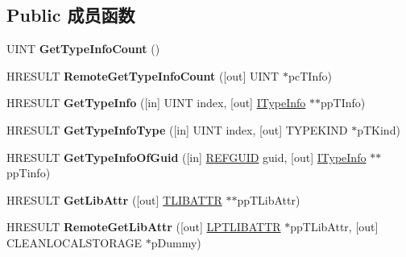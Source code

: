 \subsection*{Public 成员函数}
\begin{DoxyCompactItemize}
\item 
\mbox{\label{interface_i_type_lib_ac8e0fb0d09deff42b2c269285f9f87cd}} 
U\+I\+NT {\bfseries Get\+Type\+Info\+Count} ()
\item 
\mbox{\label{interface_i_type_lib_ab3b4927aa892c284fb67e568169d2770}} 
H\+R\+E\+S\+U\+LT {\bfseries Remote\+Get\+Type\+Info\+Count} (\mbox{[}out\mbox{]} U\+I\+NT $\ast$pc\+T\+Info)
\item 
\mbox{\label{interface_i_type_lib_a8a3fd1df05197ca1e21c4f6573a9a1ee}} 
H\+R\+E\+S\+U\+LT {\bfseries Get\+Type\+Info} (\mbox{[}in\mbox{]} U\+I\+NT index, \mbox{[}out\mbox{]} \hyperlink{interface_i_type_info}{I\+Type\+Info} $\ast$$\ast$pp\+T\+Info)
\item 
\mbox{\label{interface_i_type_lib_a8c76b724151cd1bd33f7f4d75453e283}} 
H\+R\+E\+S\+U\+LT {\bfseries Get\+Type\+Info\+Type} (\mbox{[}in\mbox{]} U\+I\+NT index, \mbox{[}out\mbox{]} T\+Y\+P\+E\+K\+I\+ND $\ast$p\+T\+Kind)
\item 
\mbox{\label{interface_i_type_lib_abb261b4a914df14578e02eae2a60dd32}} 
H\+R\+E\+S\+U\+LT {\bfseries Get\+Type\+Info\+Of\+Guid} (\mbox{[}in\mbox{]} \hyperlink{struct___g_u_i_d}{R\+E\+F\+G\+U\+ID} guid, \mbox{[}out\mbox{]} \hyperlink{interface_i_type_info}{I\+Type\+Info} $\ast$$\ast$pp\+Tinfo)
\item 
\mbox{\label{interface_i_type_lib_a6efce458d2eabd0464de409a6d8ed401}} 
H\+R\+E\+S\+U\+LT {\bfseries Get\+Lib\+Attr} (\mbox{[}out\mbox{]} \hyperlink{struct_i_type_lib_1_1tag_t_l_i_b_a_t_t_r}{T\+L\+I\+B\+A\+T\+TR} $\ast$$\ast$pp\+T\+Lib\+Attr)
\item 
\mbox{\label{interface_i_type_lib_aca7613a1c39c3c20d9762bdd884634ac}} 
H\+R\+E\+S\+U\+LT {\bfseries Remote\+Get\+Lib\+Attr} (\mbox{[}out\mbox{]} \hyperlink{struct_i_type_lib_1_1tag_t_l_i_b_a_t_t_r}{L\+P\+T\+L\+I\+B\+A\+T\+TR} $\ast$pp\+T\+Lib\+Attr, \mbox{[}out\mbox{]} C\+L\+E\+A\+N\+L\+O\+C\+A\+L\+S\+T\+O\+R\+A\+GE $\ast$p\+Dummy)
$$
\end{DoxyCompactItemize}
